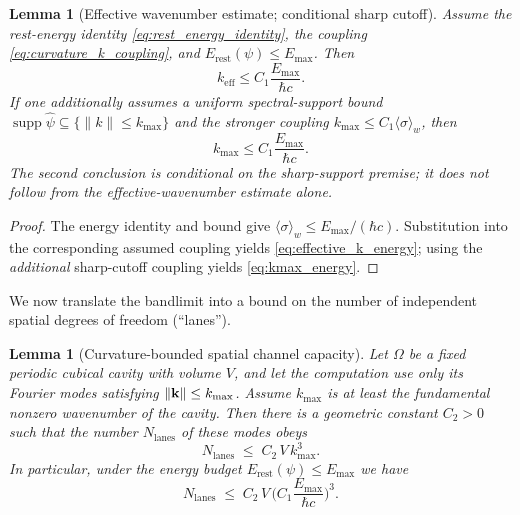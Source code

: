 \documentclass[12pt]{article}
\newtheorem{lemma}[theorem]{Lemma}
\begin{document}
\begin{lemma}[Effective wavenumber estimate; conditional sharp cutoff]
\label{lem:bandlimit}
Assume the rest-energy identity \eqref{eq:rest_energy_identity}, the
coupling \eqref{eq:curvature_k_coupling}, and
$E_{\mathrm{rest}}(\psi)\le E_{\max}$. Then
\begin{equation}
 k_{\mathrm{eff}}\le C_1\frac{E_{\max}}{\hbar c}.
 \label{eq:effective_k_energy}
\end{equation}
If one \emph{additionally assumes} a uniform spectral-support bound
$\operatorname{supp}\widehat\psi\subseteq\{\|k\|\le
k_{\max}\}$ and the stronger coupling
$k_{\max}\le C_1\langle\sigma\rangle_w$, then
\begin{equation}
 k_{\max}\le C_1\frac{E_{\max}}{\hbar c}.
 \label{eq:kmax_energy}
\end{equation}
The second conclusion is conditional on the sharp-support premise;
it does not follow from the effective-wavenumber estimate alone.
\end{lemma}



\begin{proof}
The energy identity and bound give
$\langle\sigma\rangle_w\le E_{\max}/(\hbar c)$.
Substitution into the corresponding assumed coupling yields
\eqref{eq:effective_k_energy}; using the \emph{additional}
sharp-cutoff coupling yields \eqref{eq:kmax_energy}.
\end{proof}



We now translate the bandlimit into a bound on the number of independent spatial degrees of freedom (``lanes'').

\begin{lemma}[Curvature-bounded spatial channel capacity]
\label{lem:spatial_capacity}
Let $\Omega$ be a fixed periodic cubical cavity with volume $V$, and
let the computation use only its Fourier modes satisfying
$\norm{\mathbf{k}}\le k_{\max}$. Assume $k_{\max}$ is at
least the fundamental nonzero wavenumber of the cavity. Then there
is a geometric constant $C_2>0$ such that the number
$N_{\mathrm{lanes}}$ of these modes obeys
\begin{equation}
  \label{eq:spatial_capacity}
  N_{\mathrm{lanes}} \;\le\; C_2\,V\,k_{\max}^3.
\end{equation}
In particular, under the energy budget $E_{\mathrm{rest}}(\psi) \le E_{\max}$ we have
\begin{equation}
  \label{eq:spatial_capacity_energy}
  N_{\mathrm{lanes}} \;\le\; C_2\,V\,
  \Big( C_1 \frac{E_{\max}}{\hbar c} \Big)^3.
\end{equation}
\end{lemma}
\end{document}
